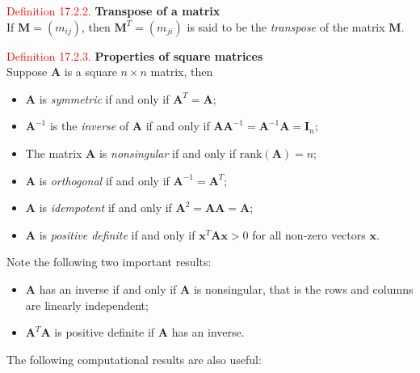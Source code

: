 \documentclass[
]{book}
\providecommand{\tightlist}{%
  \setlength{\itemsep}{0pt}\setlength{\parskip}{0pt}}
\begin{document}
\leavevmode{}%
\textcolor{red}{Definition 17.2.2.}
{\textbf{Transpose of a matrix}}\\
If \(\mathbf{M}=(m_{ij})\), then \(\mathbf{M}^T=(m_{ji})\) is said to be the \emph{transpose} of the matrix \(\mathbf{M}\).

\leavevmode{}%
\textcolor{red}{Definition 17.2.3.}
{\textbf{Properties of square matrices}}\\
Suppose \(\mathbf{A}\) is a square \(n \times n\) matrix, then

\begin{itemize}
\tightlist
\item
  \(\mathbf{A}\) is \emph{symmetric} if and only if \(\mathbf{A}^T=\mathbf{A}\);\\
\item
  \(\mathbf{A}^{-1}\) is the \emph{inverse} of \(\mathbf{A}\) if and only if \(\mathbf{A}\mathbf{A}^{-1}=\mathbf{A}^{-1}\mathbf{A}=\mathbf{I}_n\);\\
\item
  The matrix \(\mathbf{A}\) is \emph{nonsingular} if and only if \(\text{rank}(\mathbf{A})=n\);\\
\item
  \(\mathbf{A}\) is \emph{orthogonal} if and only if \(\mathbf{A}^{-1}=\mathbf{A}^T\);\\
\item
  \(\mathbf{A}\) is \emph{idempotent} if and only if \(\mathbf{A}^2=\mathbf{A}\mathbf{A}=\mathbf{A}\);\\
\item
  \(\mathbf{A}\) is \emph{positive definite} if and only if \(\mathbf{x}^T \mathbf{A} \mathbf{x} > 0\) for all non-zero vectors \(\mathbf{x}\).\\
\end{itemize}

Note the following two important results:

\begin{itemize}
\tightlist
\item
  \(\mathbf{A}\) has an inverse if and only if \(\mathbf{A}\) is nonsingular, that is the rows and columns are linearly independent;\\
\item
  \(\mathbf{A}^T \mathbf{A}\) is positive definite if \(\mathbf{A}\) has an inverse.
\end{itemize}

The following computational results are also useful:
\end{document}
